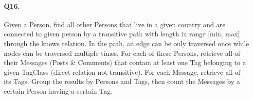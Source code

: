 \paragraph{Q16.}
Given a Person, find all other Persons that live in a given country and
are connected to given person by a transitive path with length in range
{[}min, max{]} through the knows relation.
In the path, an edge can be only traversed once while nodes can be
traversed multiple times.
For each of these Persons, retrieve all of their Messages (Posts \&
Comments) that contain at least one Tag belonging to a given TagClass
(direct relation not transitive). For each Message, retrieve all of its
Tags.
Group the results by Persons and Tags, then count the Messages by a
certain Person having a certain Tag.

